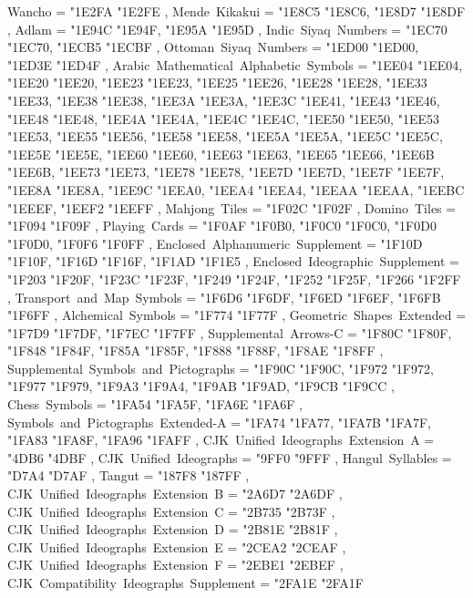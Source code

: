 {    Wancho                                         = { {"1E2FA} {"1E2FE} },
    Mende~Kikakui                                  = { {"1E8C5} {"1E8C6}, {"1E8D7} {"1E8DF} },
    Adlam                                          = { {"1E94C} {"1E94F}, {"1E95A} {"1E95D} },
    Indic~Siyaq~Numbers                            = { {"1EC70} {"1EC70}, {"1ECB5} {"1ECBF} },
    Ottoman~Siyaq~Numbers                          = { {"1ED00} {"1ED00}, {"1ED3E} {"1ED4F} },
    Arabic~Mathematical~Alphabetic~Symbols         = { {"1EE04} {"1EE04}, {"1EE20} {"1EE20}, {"1EE23} {"1EE23}, {"1EE25} {"1EE26}, {"1EE28} {"1EE28}, {"1EE33} {"1EE33}, {"1EE38} {"1EE38}, {"1EE3A} {"1EE3A}, {"1EE3C} {"1EE41}, {"1EE43} {"1EE46}, {"1EE48} {"1EE48}, {"1EE4A} {"1EE4A}, {"1EE4C} {"1EE4C}, {"1EE50} {"1EE50}, {"1EE53} {"1EE53}, {"1EE55} {"1EE56}, {"1EE58} {"1EE58}, {"1EE5A} {"1EE5A}, {"1EE5C} {"1EE5C}, {"1EE5E} {"1EE5E}, {"1EE60} {"1EE60}, {"1EE63} {"1EE63}, {"1EE65} {"1EE66}, {"1EE6B} {"1EE6B}, {"1EE73} {"1EE73}, {"1EE78} {"1EE78}, {"1EE7D} {"1EE7D}, {"1EE7F} {"1EE7F}, {"1EE8A} {"1EE8A}, {"1EE9C} {"1EEA0}, {"1EEA4} {"1EEA4}, {"1EEAA} {"1EEAA}, {"1EEBC} {"1EEEF}, {"1EEF2} {"1EEFF} },
    Mahjong~Tiles                                  = { {"1F02C} {"1F02F} },
    Domino~Tiles                                   = { {"1F094} {"1F09F} },
    Playing~Cards                                  = { {"1F0AF} {"1F0B0}, {"1F0C0} {"1F0C0}, {"1F0D0} {"1F0D0}, {"1F0F6} {"1F0FF} },
    Enclosed~Alphanumeric~Supplement               = { {"1F10D} {"1F10F}, {"1F16D} {"1F16F}, {"1F1AD} {"1F1E5} },
    Enclosed~Ideographic~Supplement                = { {"1F203} {"1F20F}, {"1F23C} {"1F23F}, {"1F249} {"1F24F}, {"1F252} {"1F25F}, {"1F266} {"1F2FF} },
    Transport~and~Map~Symbols                      = { {"1F6D6} {"1F6DF}, {"1F6ED} {"1F6EF}, {"1F6FB} {"1F6FF} },
    Alchemical~Symbols                             = { {"1F774} {"1F77F} },
    Geometric~Shapes~Extended                      = { {"1F7D9} {"1F7DF}, {"1F7EC} {"1F7FF} },
    Supplemental~Arrows-C                          = { {"1F80C} {"1F80F}, {"1F848} {"1F84F}, {"1F85A} {"1F85F}, {"1F888} {"1F88F}, {"1F8AE} {"1F8FF} },
    Supplemental~Symbols~and~Pictographs           = { {"1F90C} {"1F90C}, {"1F972} {"1F972}, {"1F977} {"1F979}, {"1F9A3} {"1F9A4}, {"1F9AB} {"1F9AD}, {"1F9CB} {"1F9CC} },
    Chess~Symbols                                  = { {"1FA54} {"1FA5F}, {"1FA6E} {"1FA6F} },
    Symbols~and~Pictographs~Extended-A             = { {"1FA74} {"1FA77}, {"1FA7B} {"1FA7F}, {"1FA83} {"1FA8F}, {"1FA96} {"1FAFF} },
    CJK~Unified~Ideographs~Extension~A             = { {"4DB6} {"4DBF} },
    CJK~Unified~Ideographs                         = { {"9FF0} {"9FFF} },
    Hangul~Syllables                               = { {"D7A4} {"D7AF} },
    Tangut                                         = { {"187F8} {"187FF} },
    CJK~Unified~Ideographs~Extension~B             = { {"2A6D7} {"2A6DF} },
    CJK~Unified~Ideographs~Extension~C             = { {"2B735} {"2B73F} },
    CJK~Unified~Ideographs~Extension~D             = { {"2B81E} {"2B81F} },
    CJK~Unified~Ideographs~Extension~E             = { {"2CEA2} {"2CEAF} },
    CJK~Unified~Ideographs~Extension~F             = { {"2EBE1} {"2EBEF} },
    CJK~Compatibility~Ideographs~Supplement        = { {"2FA1E} {"2FA1F} }
  }
